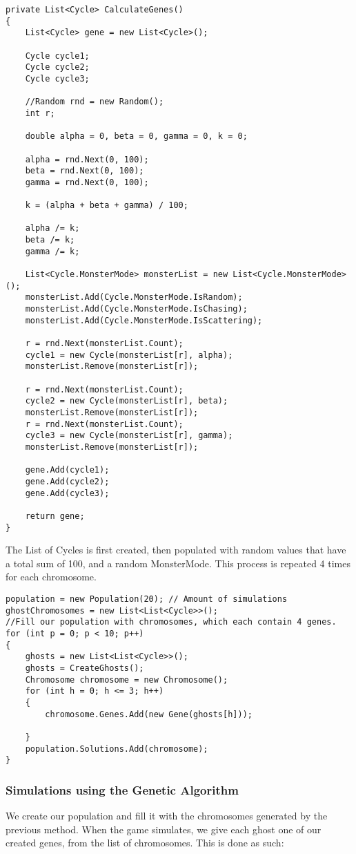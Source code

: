 \begin{lstlisting}[caption=Snippet of GA.cs. Gene creation method, label=lst:genes]
private List<Cycle> CalculateGenes()
{
	List<Cycle> gene = new List<Cycle>();

	Cycle cycle1;
	Cycle cycle2;
	Cycle cycle3;

	//Random rnd = new Random();
	int r;

	double alpha = 0, beta = 0, gamma = 0, k = 0;

	alpha = rnd.Next(0, 100);
	beta = rnd.Next(0, 100);
	gamma = rnd.Next(0, 100);

	k = (alpha + beta + gamma) / 100;

	alpha /= k;
	beta /= k;
	gamma /= k;

	List<Cycle.MonsterMode> monsterList = new List<Cycle.MonsterMode>();
	monsterList.Add(Cycle.MonsterMode.IsRandom);
	monsterList.Add(Cycle.MonsterMode.IsChasing);
	monsterList.Add(Cycle.MonsterMode.IsScattering);

	r = rnd.Next(monsterList.Count);
	cycle1 = new Cycle(monsterList[r], alpha);
	monsterList.Remove(monsterList[r]);

	r = rnd.Next(monsterList.Count);
	cycle2 = new Cycle(monsterList[r], beta);
	monsterList.Remove(monsterList[r]);
	r = rnd.Next(monsterList.Count);
	cycle3 = new Cycle(monsterList[r], gamma);
	monsterList.Remove(monsterList[r]);

	gene.Add(cycle1);
	gene.Add(cycle2);
	gene.Add(cycle3);

	return gene;
}
\end{lstlisting}

The List of Cycles is first created, then populated with random values that have a total sum of 100, and a random MonsterMode. This process is repeated 4 times for each chromosome.

\begin{lstlisting}[caption=Snippet of GA.cs. Adding genes to chromosomes, label=lst:geneChromosome]
population = new Population(20); // Amount of simulations
ghostChromosomes = new List<List<Cycle>>();
//Fill our population with chromosomes, which each contain 4 genes.
for (int p = 0; p < 10; p++)
{
	ghosts = new List<List<Cycle>>();
	ghosts = CreateGhosts();
	Chromosome chromosome = new Chromosome();
	for (int h = 0; h <= 3; h++)
	{
		chromosome.Genes.Add(new Gene(ghosts[h]));

	}
	population.Solutions.Add(chromosome);
}
\end{lstlisting}

\subsubsection*{Simulations using the Genetic Algorithm}
We create our population and fill it with the chromosomes generated by the previous method. When the game simulates, we give each ghost one of our created genes, from the list of chromosomes. This is done as such:

